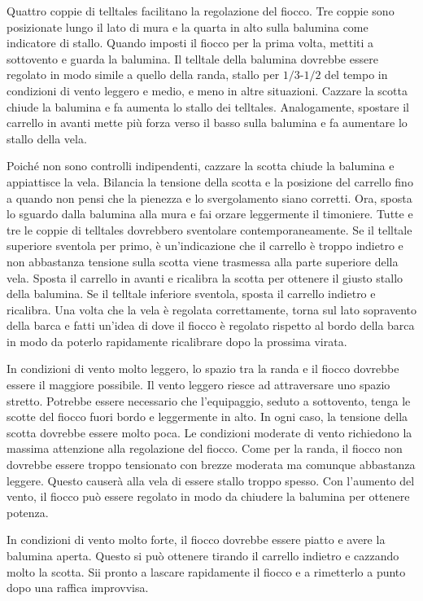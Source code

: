 Quattro coppie di telltales facilitano la regolazione del fiocco. Tre coppie
sono posizionate lungo il lato di mura e la quarta in alto sulla balumina come
indicatore di stallo. Quando imposti il fiocco per la prima volta, mettiti a
sottovento e guarda la balumina. Il telltale della balumina dovrebbe essere
regolato in modo simile a quello della randa, stallo per $1/3$-$1/2$ del tempo
in condizioni di vento leggero e medio, e meno in altre situazioni. Cazzare la
scotta chiude la balumina e fa aumenta lo stallo dei telltales. Analogamente,
spostare il carrello in avanti mette più forza verso il basso sulla balumina e
fa aumentare lo stallo della vela. 

Poiché non sono controlli indipendenti,
cazzare la scotta chiude la balumina e appiattisce la vela. Bilancia la tensione
della scotta e la posizione del carrello fino a quando non pensi che la pienezza
e lo svergolamento siano corretti. Ora, sposta lo sguardo dalla balumina alla
mura e fai orzare leggermente il timoniere. Tutte e tre le coppie di telltales
dovrebbero sventolare contemporaneamente. Se il telltale superiore sventola per
primo, è un'indicazione che il carrello è troppo indietro e non abbastanza
tensione sulla scotta viene trasmessa alla parte superiore della vela. Sposta il
carrello in avanti e ricalibra la scotta per ottenere il giusto stallo della
balumina. Se il telltale inferiore sventola, sposta il carrello indietro e
ricalibra. Una volta che la vela è regolata correttamente, torna sul lato
sopravento della barca e fatti un'idea di dove il fiocco è regolato rispetto al
bordo della barca in modo da poterlo rapidamente ricalibrare dopo la prossima
virata. 

In condizioni di vento molto leggero, lo spazio tra la randa e il fiocco dovrebbe
essere il maggiore possibile. Il vento leggero riesce ad attraversare uno spazio
stretto. Potrebbe essere necessario che l'equipaggio, seduto a sottovento, tenga
le scotte del fiocco fuori bordo e leggermente in alto. In ogni caso, la
tensione della scotta dovrebbe essere molto poca. Le condizioni moderate di vento
richiedono la massima attenzione alla regolazione del fiocco. Come per la randa,
il fiocco non dovrebbe essere troppo tensionato con brezze moderata ma comunque
abbastanza leggere. Questo causerà alla vela di essere stallo troppo spesso. Con
l'aumento del vento, il fiocco può essere regolato in modo da chiudere la
balumina per ottenere potenza. 

In condizioni di vento molto forte, il fiocco
dovrebbe essere piatto e avere la balumina aperta. Questo si può ottenere
tirando il carrello indietro e
cazzando molto la scotta. Sii pronto a lascare rapidamente il fiocco
e a rimetterlo a punto dopo una raffica improvvisa. 